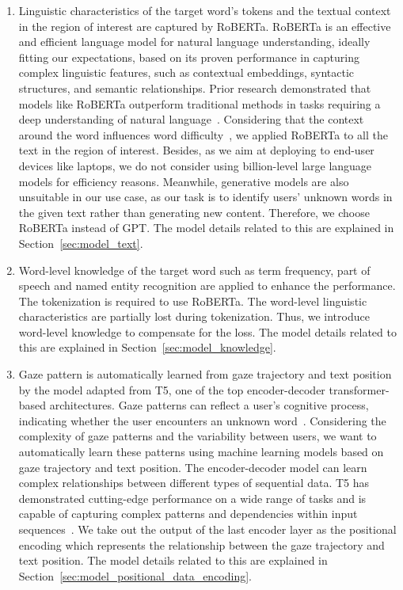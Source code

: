 \begin{enumerate}
    \item Linguistic characteristics of the target word's tokens and the textual context in the region of interest are captured by RoBERTa. RoBERTa is an effective and efficient language model for natural language understanding, ideally fitting our expectations, based on its proven performance in capturing complex linguistic features, such as contextual embeddings, syntactic structures, and semantic relationships. Prior research demonstrated that models like RoBERTa outperform traditional methods in tasks requiring a deep understanding of natural language~\cite{liu2019roberta}. Considering that the context around the word influences word difficulty~\cite{More_than_frequency}, we applied RoBERTa to all the text in the region of interest. Besides, as we aim at deploying \name{} to end-user devices like laptops, we do not consider using billion-level large language models for efficiency reasons. Meanwhile, generative models are also unsuitable in our use case, as our task is to identify users' unknown words in the given text rather than generating new content. Therefore, we choose RoBERTa instead of GPT. The model details related to this are explained in Section~\ref{sec:model_text}.
    \item Word-level knowledge of the target word such as term frequency, part of speech and named entity recognition are applied to enhance the performance. The tokenization is required to use RoBERTa. The word-level linguistic characteristics are partially lost during tokenization. Thus, we introduce word-level knowledge to compensate for the loss. The model details related to this are explained in Section~\ref{sec:model_knowledge}.
    \item Gaze pattern is automatically learned from gaze trajectory and text position by the model adapted from T5, one of the top encoder-decoder transformer-based architectures. Gaze patterns can reflect a user’s cognitive process, indicating whether the user encounters an unknown word~\cite{just1980theory}. Considering the complexity of gaze patterns and the variability between users, we want to automatically learn these patterns using machine learning models based on gaze trajectory and text position. The encoder-decoder model can learn complex relationships between different types of sequential data. T5 has demonstrated cutting-edge performance on a wide range of tasks and is capable of capturing complex patterns and dependencies within input sequences~\cite{raffel2020exploring}. We take out the output of the last encoder layer as the positional encoding which represents the relationship between the gaze trajectory and text position. The model details related to this are explained in Section~\ref{sec:model_positional_data_encoding}.
\end{enumerate}

